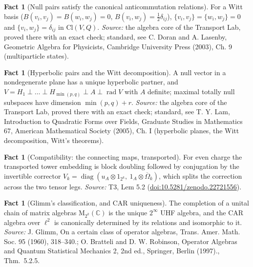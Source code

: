 \documentclass[11pt]{article}
\theoremstyle{definition}
\newtheorem{fact}[theorem]{Fact}
\theoremstyle{plain}
\providecommand{\C}{}\renewcommand{\C}{\mathbb{C}}
\providecommand{\Cl}{}\renewcommand{\Cl}{\mathrm{Cl}}
\providecommand{\Mat}{}\renewcommand{\Mat}{\mathrm{M}}
\begin{document}
\begin{fact}[Null pairs satisfy the canonical anticommutation relations]\label{c:std-algebra.witt-basis-car}
For a Witt basis ($B(v_i,v_j) = B(w_i,w_j) = 0$, $B(v_i,w_j) = \tfrac12\delta_{ij}$), $\{v_i,v_j\} = \{w_i,w_j\} = 0$ and $\{v_i,w_j\} = \delta_{ij}$ in $\Cl(V,Q)$.
\emph{Source:} the algebra core of the Transport Lab, proved there with an exact check; standard, see C. Doran and A. Lasenby, Geometric Algebra for Physicists, Cambridge University Press (2003), Ch. 9 (multiparticle states).
\end{fact}

\begin{fact}[Hyperbolic pairs and the Witt decomposition]\label{c:std-algebra.witt-decomposition}
A null vector in a nondegenerate plane has a unique hyperbolic partner, and $V = H_1 \perp \dots \perp H_{\min(p,q)} \perp A \perp \operatorname{rad} V$ with $A$ definite; maximal totally null subspaces have dimension $\min(p,q) + r$.
\emph{Source:} the algebra core of the Transport Lab, proved there with an exact check; standard, see T. Y. Lam, Introduction to Quadratic Forms over Fields, Graduate Studies in Mathematics 67, American Mathematical Society (2005), Ch. I (hyperbolic planes, the Witt decomposition, Witt's theorems).
\end{fact}

\begin{fact}[Compatibility: the connecting maps, transported]\label{c:tower.compatibility-connecting-maps-transported}
For even charge the transported tower embedding is block doubling followed by conjugation by the invertible corrector $V_k = \operatorname{diag}(u_A \otimes 1_{2^k},\ 1_A \otimes \overline\Omega_k)$, which splits the correction across the two tensor legs.
\emph{Source:} T3, Lem 5.2 (\href{https://doi.org/10.5281/zenodo.22721556}{doi:10.5281/zenodo.22721556}).
\end{fact}

\begin{fact}[Glimm's classification, and CAR uniqueness]\label{c:tower.glimms-classification-car-uniqueness}
The completion of a unital chain of matrix algebras $\Mat_{2^k}(\C)$ is the unique $2^\infty$ UHF algebra, and the CAR algebra over $\ell^2$ is canonically determined by its relations and isomorphic to it.
\emph{Source:} J. Glimm, On a certain class of operator algebras, Trans. Amer. Math. Soc. 95 (1960), 318--340.; O. Bratteli and D. W. Robinson, Operator Algebras and Quantum Statistical Mechanics 2, 2nd ed., Springer, Berlin (1997)., Thm.~5.2.5.
\end{fact}
\end{document}
